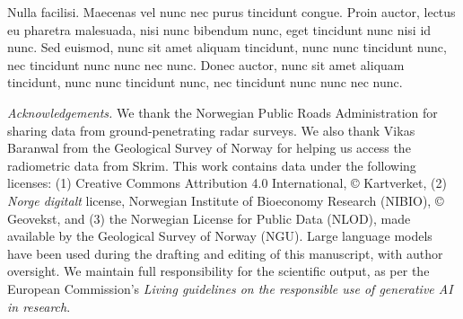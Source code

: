 \documentclass[soil, manuscript]{copernicus}
\begin{document}
Nulla facilisi.
Maecenas vel nunc nec purus tincidunt congue.
Proin auctor, lectus eu pharetra malesuada,
nisi nunc bibendum nunc,
eget tincidunt nunc nisi id nunc.
Sed euismod, nunc sit amet aliquam tincidunt,
nunc nunc tincidunt nunc,
nec tincidunt nunc nunc nec nunc.
Donec auctor, nunc sit amet aliquam tincidunt,
nunc nunc tincidunt nunc,
nec tincidunt nunc nunc nec nunc.











\begin{acknowledgements}
\emph{Acknowledgements.} We thank the Norwegian Public Roads Administration for sharing data from ground-penetrating radar surveys. We also thank Vikas Baranwal from the Geological Survey of Norway for helping us access the radiometric data from Skrim. This work contains data under the following licenses: (1) Creative Commons Attribution 4.0 International, © Kartverket, (2) \emph{Norge digitalt} license, Norwegian Institute of Bioeconomy Research (NIBIO), © Geovekst, and (3) the Norwegian License for Public Data (NLOD), made available by the Geological Survey of Norway (NGU). Large language models have been used during the drafting and editing of this manuscript, with author oversight. We maintain full responsibility for the scientific output, as per the European Commission's \emph{Living guidelines on the responsible use of generative AI in research}.
\end{acknowledgements}
\end{document}
